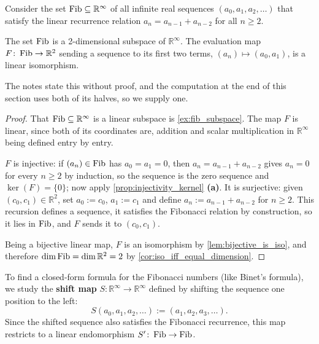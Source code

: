 Consider the set $\operatorname{Fib} \subseteq \mathbb{R}^\infty$ of all infinite real sequences $(a_0, a_1, a_2, \dots)$ that satisfy the linear recurrence relation $a_n = a_{n-1} + a_{n-2}$ for all $n \ge 2$.

\begin{proposition}
  \label{prop:fibonacci_structure}
  The set $\operatorname{Fib}$ is a 2-dimensional subspace of $\mathbb{R}^\infty$. The evaluation map $F \colon \operatorname{Fib} \to \mathbb{R}^2$ sending a sequence to its first two terms, $(a_n) \mapsto (a_0, a_1)$, is a linear isomorphism.
\end{proposition}

The notes state this without proof, and the computation at the end of this section uses both of its halves, so we supply one.

\begin{proof}
That $\operatorname{Fib} \subseteq \mathbb{R}^\infty$ is a linear subspace is \cref{ex:fib_subspace}. The map $F$ is linear, since both of its coordinates are, addition and scalar multiplication in $\mathbb{R}^\infty$ being defined entry by entry.

$F$ is injective: if $(a_n) \in \operatorname{Fib}$ has $a_0 = a_1 = 0$, then $a_n = a_{n-1} + a_{n-2}$ gives $a_n = 0$ for every $n \ge 2$ by induction, so the sequence is the zero sequence and $\ker(F) = \{0\}$; now apply \cref{prop:injectivity_kernel} \textbf{(a)}. It is surjective: given $(c_0, c_1) \in \mathbb{R}^2$, set $a_0 := c_0$, $a_1 := c_1$ and define $a_n := a_{n-1} + a_{n-2}$ for $n \ge 2$. This recursion defines a sequence, it satisfies the Fibonacci relation by construction, so it lies in $\operatorname{Fib}$, and $F$ sends it to $(c_0, c_1)$.

Being a bijective linear map, $F$ is an isomorphism by \cref{lem:bijective_is_iso}, and therefore $\dim \operatorname{Fib} = \dim \mathbb{R}^2 = 2$ by \cref{cor:iso_iff_equal_dimension}.
\end{proof}

To find a closed-form formula for the Fibonacci numbers (like Binet's formula), we study the \textbf{shift map} $S \colon \mathbb{R}^\infty \to \mathbb{R}^\infty$ defined by shifting the sequence one position to the left:
\[ S(a_0, a_1, a_2, \dots) := (a_1, a_2, a_3, \dots). \]
Since the shifted sequence also satisfies the Fibonacci recurrence, this map restricts to a linear endomorphism $S' \colon \operatorname{Fib} \to \operatorname{Fib}$.

